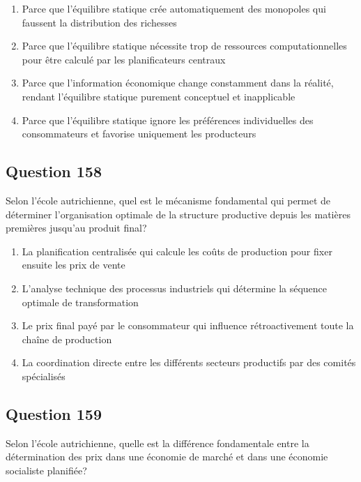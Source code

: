 \documentclass[12pt,a4paper]{article}
\begin{document}
\begin{enumerate}[label=\Alph*., leftmargin=*]
\item Parce que l'équilibre statique crée automatiquement des monopoles qui faussent la distribution des richesses
\item Parce que l'équilibre statique nécessite trop de ressources computationnelles pour être calculé par les planificateurs centraux
\item Parce que l'information économique change constamment dans la réalité, rendant l'équilibre statique purement conceptuel et inapplicable
\item Parce que l'équilibre statique ignore les préférences individuelles des consommateurs et favorise uniquement les producteurs
\end{enumerate}

\bigskip


\subsection*{Question 158}
Selon l'école autrichienne, quel est le mécanisme fondamental qui permet de déterminer l'organisation optimale de la structure productive depuis les matières premières jusqu'au produit final?

\begin{enumerate}[label=\Alph*., leftmargin=*]
\item La planification centralisée qui calcule les coûts de production pour fixer ensuite les prix de vente
\item L'analyse technique des processus industriels qui détermine la séquence optimale de transformation
\item Le prix final payé par le consommateur qui influence rétroactivement toute la chaîne de production
\item La coordination directe entre les différents secteurs productifs par des comités spécialisés
\end{enumerate}

\bigskip


\subsection*{Question 159}
Selon l'école autrichienne, quelle est la différence fondamentale entre la détermination des prix dans une économie de marché et dans une économie socialiste planifiée?
\end{document}
